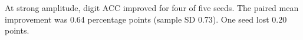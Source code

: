 At strong amplitude, digit ACC improved for four of five seeds. The paired mean improvement was 0.64 percentage points (sample SD 0.73). One seed lost 0.20 points.
